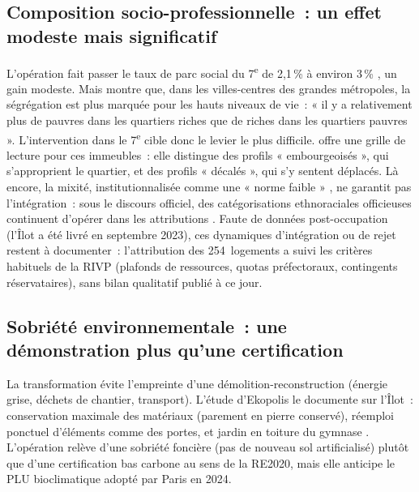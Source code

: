 \documentclass[a4paper,12pt]{article}
\begin{document}
\subsection{Composition socio-professionnelle~: un effet modeste mais significatif}

L'opération fait passer le taux de parc social du 7\textsuperscript{e} de 2,1\,\% à environ 3\,\% \parencite{Ekopolis2025IlotSG}, un gain modeste. Mais \textcite{Floch2017Segregation} montre que, dans les villes-centres des grandes métropoles, la ségrégation est plus marquée pour les hauts niveaux de vie~: « il y a relativement plus de pauvres dans les quartiers riches que de riches dans les quartiers pauvres ». L'intervention dans le 7\textsuperscript{e} cible donc le levier le plus difficile. \textcite{Launay2012HLMBeauxQuartiers} offre une grille de lecture pour ces immeubles~: elle distingue des profils « embourgeoisés », qui s'approprient le quartier, et des profils « décalés », qui s'y sentent déplacés. Là encore, la mixité, institutionnalisée comme une « norme faible » \parencite{Tissot2005}, ne garantit pas l'intégration~: sous le discours officiel, des catégorisations ethnoraciales officieuses continuent d'opérer dans les attributions \parencite{CollectifApi2021MixiteRace}. Faute de données post-occupation (l'Îlot a été livré en septembre 2023), ces dynamiques d'intégration ou de rejet restent à documenter~: l'attribution des 254~logements a suivi les critères habituels de la RIVP (plafonds de ressources, quotas préfectoraux, contingents réservataires), sans bilan qualitatif publié à ce jour.

\subsection{Sobriété environnementale~: une démonstration plus qu'une certification}

La transformation évite l'empreinte d'une démolition-reconstruction (énergie grise, déchets de chantier, transport). L'étude d'Ekopolis le documente sur l'Îlot~: conservation maximale des matériaux (parement en pierre conservé), réemploi ponctuel d'éléments comme des portes, et jardin en toiture du gymnase \parencite{Ekopolis2025IlotSG}. L'opération relève d'une sobriété foncière (pas de nouveau sol artificialisé) plutôt que d'une certification bas carbone au sens de la RE2020, mais elle anticipe le PLU bioclimatique adopté par Paris en 2024.
\end{document}
